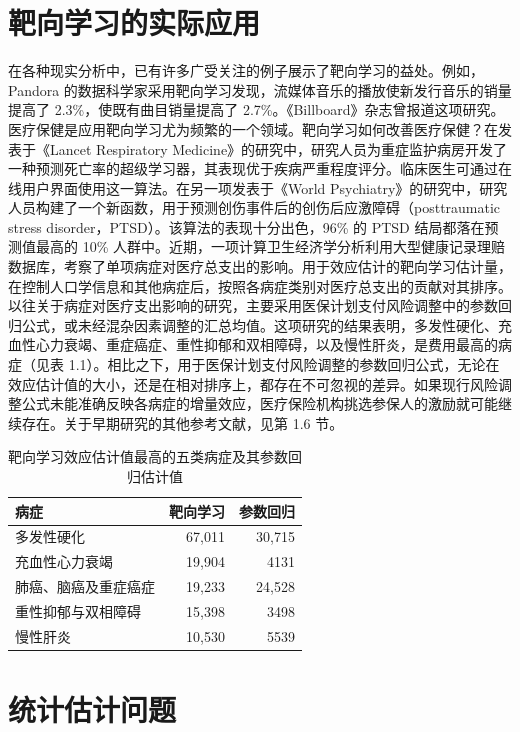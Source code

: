 \section{靶向学习的实际应用}
\label{sec:ch01-in-practice}

在各种现实分析中，已有许多广受关注的例子展示了靶向学习的益处。例如，Pandora 的数据科学家采用靶向学习发现，流媒体音乐的播放使新发行音乐的销量提高了 2.3\%，使既有曲目销量提高了 2.7\%。《Billboard》杂志曾报道这项研究。医疗保健是应用靶向学习尤为频繁的一个领域。靶向学习如何改善医疗保健？在发表于《Lancet Respiratory Medicine》的研究中，研究人员为重症监护病房开发了一种预测死亡率的超级学习器，其表现优于疾病严重程度评分。临床医生可通过在线用户界面使用这一算法。在另一项发表于《World Psychiatry》的研究中，研究人员构建了一个新函数，用于预测创伤事件后的创伤后应激障碍（posttraumatic stress disorder，PTSD）。该算法的表现十分出色，96\% 的 PTSD 结局都落在预测值最高的 10\% 人群中。近期，一项计算卫生经济学分析利用大型健康记录理赔数据库，考察了单项病症对医疗总支出的影响。用于效应估计的靶向学习估计量，在控制人口学信息和其他病症后，按照各病症类别对医疗总支出的贡献对其排序。以往关于病症对医疗支出影响的研究，主要采用医保计划支付风险调整中的参数回归公式，或未经混杂因素调整的汇总均值。这项研究的结果表明，多发性硬化、充血性心力衰竭、重症癌症、重性抑郁和双相障碍，以及慢性肝炎，是费用最高的病症（见表 1.1）。相比之下，用于医保计划支付风险调整的参数回归公式，无论在效应估计值的大小，还是在相对排序上，都存在不可忽视的差异。如果现行风险调整公式未能准确反映各病症的增量效应，医疗保险机构挑选参保人的激励就可能继续存在。关于早期研究的其他参考文献，见第 1.6 节。

\begin{table}[htbp]
 \centering
 \caption{靶向学习效应估计值最高的五类病症及其参数回归估计值}
 \label{tab:ch01-cost-estimates}
 \begin{tabular}{lrr}
  \toprule
  病症 & 靶向学习 & 参数回归\\
  \midrule
  多发性硬化 & 67,011 & 30,715\\
  充血性心力衰竭 & 19,904 & 4131\\
  肺癌、脑癌及重症癌症 & 19,233 & 24,528\\
  重性抑郁与双相障碍 & 15,398 & 3498\\
  慢性肝炎 & 10,530 & 5539\\
  \bottomrule
 \end{tabular}
\end{table}

\section{统计估计问题}
\label{sec:ch01-statistical-estimation}

